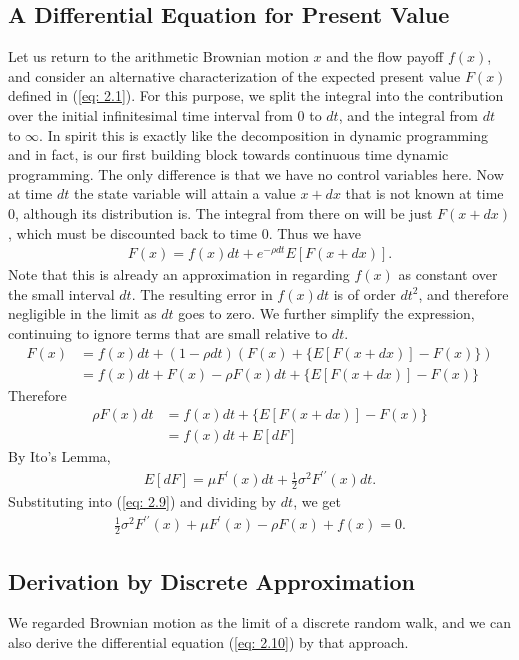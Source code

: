 \documentclass[\topdir/lecture\_notes.tex]{subfiles}
\begin{document}
\subsection{A Differential Equation for Present Value}
Let us return to the arithmetic Brownian motion $x$ and the flow payoff $f(x)$, and consider an alternative characterization of the expected present value $F(x)$ defined in (\ref{eq: 2.1}). For this purpose, we split the integral into the contribution over the initial infinitesimal time interval from $0$ to $dt$, and the integral from $dt$ to $\infty$. In spirit this is exactly like the decomposition in dynamic programming and in fact, is our first building block towards continuous time dynamic programming. The only difference is that we have no control variables here. Now at time $dt$ the state variable will attain a value $x+dx$ that is not known at time $0$, although its distribution is. The integral from there on will be just $F(x+dx)$, which must be discounted back to time $0$. Thus we have
\begin{align*}
F(x)=f(x) dt+e^{-\rho dt} E[F(x+dx)].
\end{align*}
Note that this is already an approximation in regarding $f(x)$ as constant over the small interval $dt$. The resulting error in $f(x) dt$ is of order $dt^{2}$, and therefore negligible in the limit as $dt$ goes to zero. We further simplify the expression, continuing to ignore terms that are small relative to $dt$.
\begin{align*}
F(x) & =f(x) dt+(1-\rho dt)(F(x)+\{E[F(x+dx)]-F(x)\}) \\
& =f(x) dt+F(x)-\rho F(x) dt+\{E[F(x+dx)]-F(x)\}
\end{align*}
Therefore
\begin{align}
\rho F(x) dt & =f(x) dt+\{E[F(x+dx)]-F(x)\} \\
& =f(x) dt+E[d F]
\label{eq: 2.9}
\end{align}
By Ito's Lemma,
\begin{align*}
E[d F]=\mu F^{\prime}(x) dt+\frac{1}{2} \sigma^{2} F^{\prime \prime}(x) dt.
\end{align*}
Substituting into (\ref{eq: 2.9}) and dividing by $dt$, we get
\begin{align}
\frac{1}{2} \sigma^{2} F^{\prime \prime}(x)+\mu F^{\prime}(x)-\rho F(x)+f(x)=0 . \label{eq: 2.10}
\end{align}

\subsection{Derivation by Discrete Approximation}
We regarded Brownian motion as the limit of a discrete random walk, and we can also derive the differential equation (\ref{eq: 2.10}) by that approach.
\end{document}
